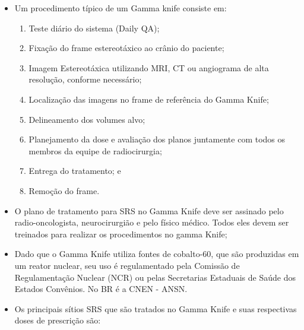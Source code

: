 \documentclass[11pt,a4paper]{article}
\newcounter{exemplo}
\begin{document}
\begin{exemplo}
\begin{itemize}
        \item Um procedimento típico de um Gamma knife consiste em:
        
            \begin{enumerate}
                \item Teste diário do sistema (Daily QA);
                \item Fixação do frame estereotáxico ao crânio do paciente;
                \item Imagem Estereotáxica utilizando MRI, CT ou angiograma de alta resolução, conforme necessário;
                \item Localização das imagens no frame de referência do Gamma Knife;
                \item Delineamento dos volumes alvo;
                \item Planejamento da dose e avaliação dos planos juntamente com todos os membros da equipe de radiocirurgia;
                \item Entrega do tratamento; e
                \item Remoção do frame.
            \end{enumerate}

        \item O plano de tratamento para SRS no Gamma Knife deve ser assinado pelo radio-oncologista, neurocirurgião e pelo físico médico. Todos eles devem ser treinados para realizar os procedimentos no gamma Knife;
        
        \item Dado que o Gamma Knife utiliza fontes de cobalto-60, que são produzidas em um reator nuclear, seu uso é regulamentado pela Comissão de Regulamentação Nuclear (NCR) ou pelas Secretarias Estaduais de Saúde dos Estados Convênios. No BR é a CNEN - ANSN.
        
        \item Os principais sítios SRS que são tratados no Gamma Knife e suas respectivas doses de prescrição são:
        

\end{itemize}
\end{exemplo}
\end{document}
